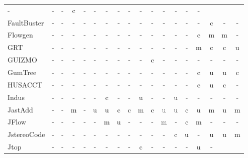 \begin{longtable}{ l *{17}{c} }
      - &
      - &
      - &
      c &
      - &
      - &
      - &
      - &
      - &
      - &
      - &
      - &
      - &
      - &
      - \\
    FaultBuster &
      - &
      - &
      - &
      - &
      - &
      - &
      - &
      - &
      - &
      - &
      - &
      - &
      - &
      - &
      c &
      - &
      - \\
    Flowgen &
      - &
      - &
      - &
      - &
      - &
      - &
      - &
      - &
      - &
      - &
      - &
      - &
      - &
      c &
      m &
      m &
      - \\
    GRT &
      - &
      - &
      - &
      - &
      - &
      - &
      - &
      - &
      - &
      - &
      - &
      - &
      - &
      m &
      c &
      c &
      u \\
    GUIZMO &
      - &
      - &
      - &
      - &
      - &
      - &
      - &
      - &
      - &
      c &
      - &
      - &
      - &
      - &
      - &
      - &
      - \\
    GumTree &
      - &
      - &
      - &
      - &
      - &
      - &
      - &
      - &
      - &
      - &
      - &
      - &
      - &
      c &
      u &
      u &
      c \\
    HUSACCT &
      - &
      - &
      - &
      - &
      - &
      - &
      - &
      - &
      - &
      - &
      - &
      - &
      - &
      c &
      u &
      c &
      - \\
    Indus &
      - &
      - &
      - &
      - &
      - &
      c &
      - &
      - &
      u &
      - &
      - &
      u &
      - &
      - &
      - &
      - &
      - \\
    JastAdd &
      - &
      - &
      m &
      - &
      u &
      u &
      c &
      c &
      m &
      c &
      u &
      u &
      c &
      u &
      m &
      u &
      m \\
    JFlow &
      - &
      - &
      - &
      - &
      - &
      m &
      u &
      - &
      - &
      - &
      m &
      - &
      c &
      m &
      - &
      - &
      - \\
    JstereoCode &
      - &
      - &
      - &
      - &
      - &
      - &
      - &
      - &
      - &
      - &
      - &
      c &
      u &
      - &
      u &
      u &
      m \\
    Jtop &
      - &
      - &
      - &
      - &
      - &
      - &
      - &
      - &
      c &
      - &
      - &
      - &
      - &
      u &
      - &

\end{longtable}
